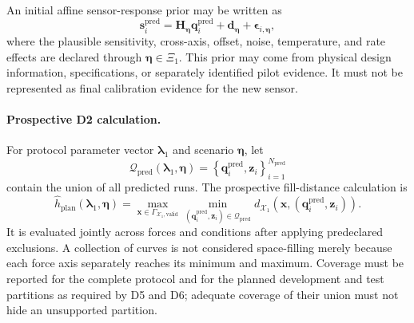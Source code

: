 \documentclass[11pt,a4paper]{article}
\begin{document}
An initial affine sensor-response prior may be written as
\begin{equation}
    \mathbf{s}^{\mathrm{pred}}_i
    =
    \mathbf{H}_{\boldsymbol{\eta}}
    \mathbf{q}^{\mathrm{pred}}_i
    +
    \mathbf{d}_{\boldsymbol{\eta}}
    +
    \boldsymbol{\epsilon}_{i,\boldsymbol{\eta}},
\end{equation}
where the plausible sensitivity, cross-axis, offset, noise, temperature, and
rate effects are declared through $\boldsymbol{\eta}\in\Xi_1$. This prior may
come from physical design information, specifications, or separately
identified pilot evidence. It must not be represented as final calibration
evidence for the new sensor.

\paragraph{Prospective D2 calculation.}
For protocol parameter vector $\boldsymbol{\lambda}_1$ and scenario
$\boldsymbol{\eta}$, let
\begin{equation}
    \mathcal{Q}_{\mathrm{pred}}
    \left(
        \boldsymbol{\lambda}_1,
        \boldsymbol{\eta}
    \right)
    =
    \left\{
        \mathbf{q}^{\mathrm{pred}}_i,
        \mathbf{z}_i
    \right\}_{i=1}^{N_{\mathrm{pred}}}
\end{equation}
contain the union of all predicted runs. The prospective fill-distance
calculation is
\begin{equation}
    \widehat{h}_{\mathrm{plan}}
    \left(
        \boldsymbol{\lambda}_1,
        \boldsymbol{\eta}
    \right)
    =
    \max_{
        \mathbf{x}
        \in
        \Gamma_{\mathcal{X}_1,\mathrm{valid}}
    }
    \min_{
        \left(
            \mathbf{q}^{\mathrm{pred}}_i,
            \mathbf{z}_i
        \right)
        \in
        \mathcal{Q}_{\mathrm{pred}}
    }
    d_{\mathcal{X}_1}
    \left(
        \mathbf{x},
        \left(
            \mathbf{q}^{\mathrm{pred}}_i,
            \mathbf{z}_i
        \right)
    \right).
\end{equation}
It is evaluated jointly across forces and conditions after applying
predeclared exclusions. A collection of curves is not considered
space-filling merely because each force axis separately reaches its minimum
and maximum. Coverage must be reported for the complete protocol and for the
planned development and test partitions as required by D5 and D6; adequate
coverage of their union must not hide an unsupported partition.
\end{document}
